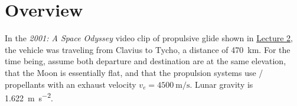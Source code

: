 


%
%

\hwkCompletionDate{\today}



\maketitle

\pagebreak

\section*{Overview} \label{sec:overview}

In the \textit{2001: A Space Odyssey} video clip of propulsive glide shown in \href{https://github.com/vaisriv/uni/blob/main/26s/ENAE488X/docs/lectures/lec02.pdf}{Lecture 2}, the vehicle was traveling from Clavius to Tycho, a distance of \qty{470}{\km}. For the time being, assume both departure and destination are at the same elevation, that the Moon is essentially flat, and that the propulsion systems use / propellants with an exhaust velocity \( v_{e} = \qty{4500}{\m\per\s} \). Lunar gravity is \qty{1.622}{\m\per\s\squared}.

